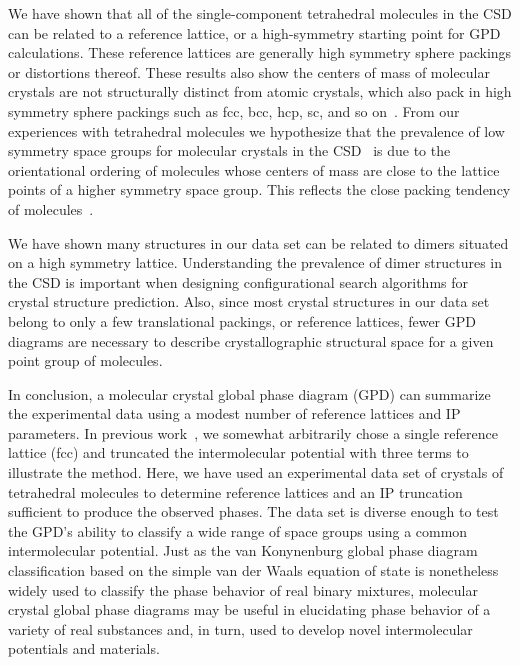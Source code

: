 \documentclass[preprint]{revtex4}              %
\begin{document}

We have shown that all of the single-component tetrahedral molecules
in the CSD can be related to a reference lattice, or a high-symmetry
starting point for GPD calculations.  These reference lattices are
generally high symmetry sphere packings or distortions thereof.
These results also show the centers of mass of molecular crystals
are not structurally distinct from atomic crystals, which also pack
in high symmetry sphere packings such as fcc, bcc, hcp, sc, and so
on~\cite{Mighell80}. From our experiences with tetrahedral molecules
we hypothesize that the prevalence of low symmetry space groups for
molecular crystals in the CSD~\cite{Allen02} is due to the
orientational ordering of molecules whose centers of mass are close
to the lattice points of a higher symmetry space group. This
reflects the close packing tendency of
molecules~\cite{Kitaigorodskii61}.

We have shown many structures in our data set can be related to
dimers situated on a high symmetry lattice. Understanding the
prevalence of dimer structures in the CSD is important when
designing configurational search algorithms for crystal structure
prediction. Also, since most crystal structures in our data set
belong to only a few translational packings, or reference lattices,
fewer GPD diagrams are necessary to describe crystallographic
structural space for a given point group of molecules.


In conclusion, a molecular crystal global phase diagram (GPD) can
summarize the experimental data using a modest number of reference
lattices and IP parameters. In previous
work~\cite{Keith04c,Mettes04}, we somewhat arbitrarily chose a
single reference lattice (fcc) and truncated the intermolecular
potential with three terms to illustrate the method. Here, we have
used an experimental data set of crystals of tetrahedral molecules
to determine reference lattices and an IP truncation sufficient to
produce the observed phases. The data set is diverse enough to test
the GPD's ability to classify a wide range of space groups using a
common intermolecular potential. Just as the van Konynenburg global
phase diagram classification based on the simple van der Waals
equation of state is nonetheless widely used to classify the phase
behavior of real binary mixtures, molecular crystal global phase
diagrams may be useful in elucidating phase behavior of a variety of
real substances and, in turn, used to develop novel intermolecular
potentials and materials.
\end{document}
